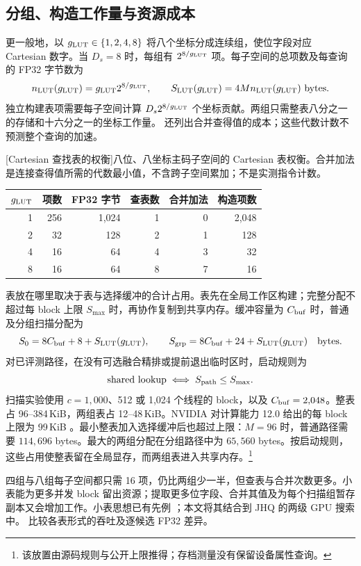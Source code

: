 \subsection{分组、构造工作量与资源成本}

更一般地，以 $g_{\mathrm{LUT}}\in\{1,2,4,8\}$ 将八个坐标分成连续组，使位字段对应 Cartesian 数字。当 $D_s=8$ 时，每组有 $2^{8/g_{\mathrm{LUT}}}$ 项。每子空间的总项数及每查询的 FP32 字节数为
\begin{equation}
 n_{\rm LUT}(g_{\mathrm{LUT}})=g_{\mathrm{LUT}} 2^{8/g_{\mathrm{LUT}}},\qquad S_{\rm LUT}(g_{\mathrm{LUT}})=4Mn_{\rm LUT}(g_{\mathrm{LUT}})\ \text{bytes}.
 \label{eq:5-lut-cost}
\end{equation}
独立构建表项需要每子空间计算 $D_s2^{8/g_{\mathrm{LUT}}}$ 个坐标贡献。两组只需整表八分之一的存储和十六分之一的坐标工作量。 还列出合并查得值的成本；这些代数计数不预测整个查询的加速。

\par\medskip\noindent\begin{minipage}{\linewidth}
\captionsetup{hypcap=false}
\centering
{}[Cartesian 查找表的权衡]{八位、八坐标主码子空间的 Cartesian 表权衡。合并加法是连接查得值所需的代数最小值，不含跨子空间累加；不是实测指令计数。}
\label{tab:5-lut-resources}
\small
\begin{tabular}{@{}rrrrrr@{}}
\toprule
$g_{\mathrm{LUT}}$ & 项数 & FP32 字节 & 查表数 & 合并加法 & 构造项数 \\
\midrule
1 & 256 & 1,024 & 1 & 0 & 2,048 \\
2 & 32 & 128 & 2 & 1 & 128 \\
4 & 16 & 64 & 4 & 3 & 32 \\
8 & 16 & 64 & 8 & 7 & 16 \\
\bottomrule
\end{tabular}
\end{minipage}\par\medskip
表放在哪里取决于表与选择缓冲的合计占用。表先在全局工作区构建；完整分配不超过每 block 上限 $S_{\max}$ 时，再协作复制到共享内存。缓冲容量为 $C_{\rm buf}$ 时，普通及分组扫描分配为
\begin{equation}
 S_0=8C_{\rm buf}+8+S_{\rm LUT}(g_{\mathrm{LUT}}),\qquad
 S_{\rm grp}=8C_{\rm buf}+24+S_{\rm LUT}(g_{\mathrm{LUT}})
 \quad\text{bytes}.
 \label{eq:5-shared-footprint}
\end{equation}
对已评测路径，在没有可选融合精排或提前退出临时区时，启动规则为
\[
 \text{shared lookup}\iff S_{\rm path}\leq S_{\max}.
\]
扫描实验使用 $c=1{,}000$、512 或 1,024 个线程的 block，以及 $C_{\rm buf}=2{,}048$。整表占 96--384\,KiB，两组表占 12--48\,KiB。NVIDIA 对计算能力 12.0 给出的每 block 上限为 99\,KiB \cite{blackwell_tuning}。最小整表加入选择缓冲后也超过上限：$M=96$ 时，普通路径需要 $114{,}696$ bytes。最大的两组分配在分组路径中为 $65{,}560$ bytes。按启动规则，这些占用使整表留在全局显存，而两组表进入共享内存。\footnote{该放置由源码规则与公开上限推得；存档测量没有保留设备属性查询。}

四组与八组每子空间都只需 16 项，仍比两组少一半，但查表与合并次数更多。小表能为更多并发 block 留出资源；提取更多位字段、合并其值及为每个扫描组暂存副本又会增加工作。小表思想已有先例 \cite{fastscan,quickeradc,ivfrabitq}；本文将其结合到 JHQ 的两级 GPU 搜索中。 比较各表形式的吞吐及逐候选 FP32 差异。

